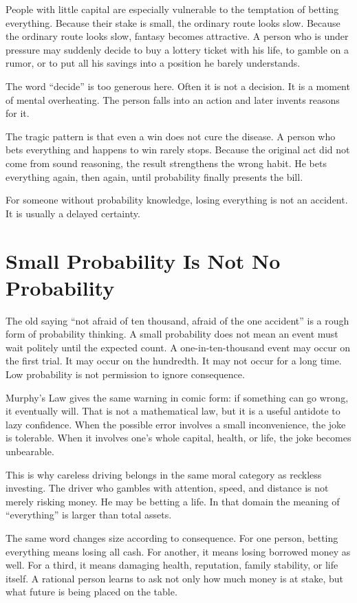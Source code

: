 People with little capital are especially vulnerable to the temptation of betting everything. Because their stake is small, the ordinary route looks slow. Because the ordinary route looks slow, fantasy becomes attractive. A person who is under pressure may suddenly decide to buy a lottery ticket with his life, to gamble on a rumor, or to put all his savings into a position he barely understands.

The word ``decide'' is too generous here. Often it is not a decision. It is a moment of mental overheating. The person falls into an action and later invents reasons for it.

The tragic pattern is that even a win does not cure the disease. A person who bets everything and happens to win rarely stops. Because the original act did not come from sound reasoning, the result strengthens the wrong habit. He bets everything again, then again, until probability finally presents the bill.

For someone without probability knowledge, losing everything is not an accident. It is usually a delayed certainty.

\section*{Small Probability Is Not No Probability}

The old saying ``not afraid of ten thousand, afraid of the one accident'' is a rough form of probability thinking. A small probability does not mean an event must wait politely until the expected count. A one-in-ten-thousand event may occur on the first trial. It may occur on the hundredth. It may not occur for a long time. Low probability is not permission to ignore consequence.

Murphy's Law gives the same warning in comic form: if something can go wrong, it eventually will. That is not a mathematical law, but it is a useful antidote to lazy confidence. When the possible error involves a small inconvenience, the joke is tolerable. When it involves one's whole capital, health, or life, the joke becomes unbearable.

This is why careless driving belongs in the same moral category as reckless investing. The driver who gambles with attention, speed, and distance is not merely risking money. He may be betting a life. In that domain the meaning of ``everything'' is larger than total assets.

The same word changes size according to consequence. For one person, betting everything means losing all cash. For another, it means losing borrowed money as well. For a third, it means damaging health, reputation, family stability, or life itself. A rational person learns to ask not only how much money is at stake, but what future is being placed on the table.

